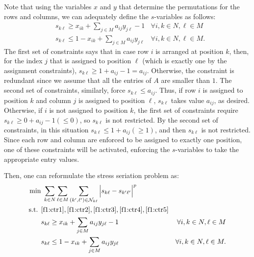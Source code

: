 \documentclass[a4paper,11pt, reqno]{amsart}
\begin{document}
Note that using the variables $x$ and $y$ that determine the permutations for the rows and columns, we can adequately define the $s$-variables as follows:
\begin{align*}
& s_{k\ell } \geq x_{ik} + \sum_{j\in M} a_{ij} y_{j\ell } -1
    \ \ \ \ \forall i, k \in N, \ell  \in M\\
& s_{k\ell }\le 1 - x_{ik} + \sum_{j \in M} a_{ij} y_{j\ell }\ \ \ \ \forall i,k \in N, \ell  \in M.
\end{align*}
The first set of constraints says that in case row $i$ is arranged at position $k$, then, for the index $j$ that is assigned to position $\ell $ (which is exactly one by the assignment constraints), $s_{k\ell } \geq 1 + a_{ij} -1 = a_{ij}$. Otherwise, the constraint is redundant since we assume that all the entries of $A$ are smaller than $1$. The second set of constraints, similarly, force $s_{k\ell } \leq a_{ij}$. Thus, if row $i$ is assigned to position $k$ and column $j$ is assigned to position $\ell $, $s_{k\ell }$ takes value $a_{ij}$, as desired. Otherwise, if $i$ is not assigned to position $k$, the first set of constraints require $s_{k\ell } \geq 0 + a_{ij} - 1 (\leq 0)$, so $s_{k\ell }$ is not restricted. By the second set of constraints, in this situation $s_{k\ell } \leq 1 + a_{ij} (\geq 1)$, and then $s_{k\ell }$ is not restricted. Since each row and column are enforced to be assigned to exactly one position, one of these constraints will be activated, enforcing the $s$-variables to take the appropriate entry values.

Then, one can reformulate the stress seriation problem as:
\begin{align}
\min & \; \sum_{k\in N} \sum_{\ell \in M}  \sum_{(k',\ell ') \in \mathcal{N}_{k\ell}} \Big|s_{k\ell } - s_{k'\ell '}\Big|^p\label{f1a:obj}\\
\nonumber \mbox{s.t. } & \eqref{f1:ctr1}, \eqref{f1:ctr2}, \eqref{f1:ctr3}, \eqref{f1:ctr4}, \eqref{f1:ctr5} \\
& s_{k\ell } \geq x_{ik} + \sum_{j\in M} a_{ij} y_{j\ell } -1 & \forall i, k \in N, \ell  \in M \label{f1a:ctr5}\\
& s_{k\ell }\le 1 - x_{ik} + \sum_{j \in M} a_{ij} y_{j\ell } &   \forall i,k \in N, \ell  \in M. \label{f1a:ctr6}
\end{align}
\end{document}
